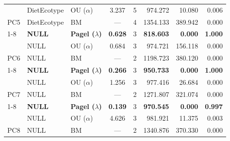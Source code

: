\begin{table}[!h]
\begin{tabular}[t]{lllccrrr}
 & DietEcotype & OU ($\alpha$) & 3.237 & 5 & 974.272 & 10.080 & 0.006\\

\multirow{-3}{*}{\raggedright\arraybackslash PC5} & DietEcotype & BM & --- & 4 & 1354.133 & 389.942 & 0.000\\
\cmidrule{1-8}
 & \textbf{NULL} & \textbf{Pagel ($\lambda$)} & \textbf{0.628} & 3 & \textbf{818.603} & \textbf{0.000} & \textbf{1.000}\\

 & NULL & OU ($\alpha$) & 0.684 & 3 & 974.721 & 156.118 & 0.000\\

\multirow{-3}{*}{\raggedright\arraybackslash PC6} & NULL & BM & --- & 2 & 1198.723 & 380.120 & 0.000\\
\cmidrule{1-8}
 & \textbf{NULL} & \textbf{Pagel ($\lambda$)} & \textbf{0.266} & 3 & \textbf{950.733} & \textbf{0.000} & \textbf{1.000}\\

 & NULL & OU ($\alpha$) & 1.256 & 3 & 977.416 & 26.684 & 0.000\\

\multirow{-3}{*}{\raggedright\arraybackslash PC7} & NULL & BM & --- & 2 & 1271.807 & 321.074 & 0.000\\
\cmidrule{1-8}
 & \textbf{NULL} & \textbf{Pagel ($\lambda$)} & \textbf{0.139} & 3 & \textbf{970.545} & \textbf{0.000} & \textbf{0.997}\\

 & NULL & OU ($\alpha$) & 4.626 & 3 & 981.921 & 11.375 & 0.003\\

\multirow{-3}{*}{\raggedright\arraybackslash PC8} & NULL & BM & --- & 2 & 1340.876 & 370.330 & 0.000\\
\bottomrule
\end{tabular}
\end{table}
